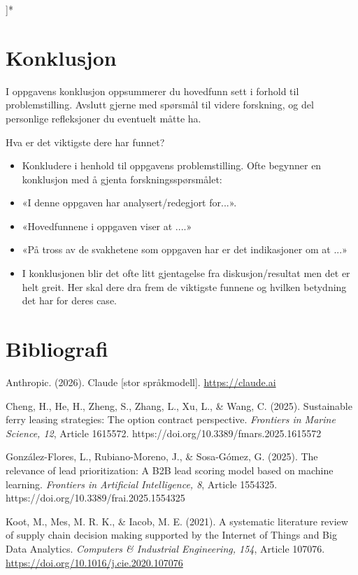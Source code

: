 \documentclass[a4paper,11pt]{article}
\begin{document}
]*

\section{Konklusjon}

I oppgavens konklusjon oppsummerer du hovedfunn sett i forhold til problemstilling.   Avslutt gjerne med spørsmål til videre forskning, og del personlige refleksjoner du eventuelt måtte ha.

Hva er det viktigste dere har funnet?

\begin{itemize}
\item Konkludere i henhold til oppgavens problemstilling. Ofte begynner en konklusjon med å gjenta forskningsspørsmålet:  
\item «I denne oppgaven har analysert/redegjort for...».  
\item «Hovedfunnene i oppgaven viser at ....»  
\item «På tross av de svakhetene som oppgaven har er det indikasjoner om at ...»  
\item I konklusjonen blir det ofte litt gjentagelse fra diskusjon/resultat men det er helt greit. Her skal dere dra frem de viktigste funnene og hvilken betydning det har for deres case.
\end{itemize}

\section{Bibliografi}

Anthropic. (2026). Claude [stor språkmodell]. \href{https://claude.ai}{https://claude.ai}

Cheng, H., He, H., Zheng, S., Zhang, L., Xu, L., \& Wang, C. (2025). Sustainable ferry leasing strategies: The option contract perspective. \textit{Frontiers in Marine Science, 12}, Article 1615572. https://doi.org/10.3389/fmars.2025.1615572

González-Flores, L., Rubiano-Moreno, J., \& Sosa-Gómez, G. (2025). The relevance of lead prioritization: A B2B lead scoring model based on machine learning. \textit{Frontiers in Artificial Intelligence, 8}, Article 1554325. https://doi.org/10.3389/frai.2025.1554325

Koot, M., Mes, M. R. K., \& Iacob, M. E. (2021). A systematic literature review of supply chain decision making supported by the Internet of Things and Big Data Analytics. \textit{Computers \& Industrial Engineering, 154}, Article 107076. \href{https://doi.org/10.1016/j.cie.2020.107076}{https://doi.org/10.1016/j.cie.2020.107076}
\end{document}
